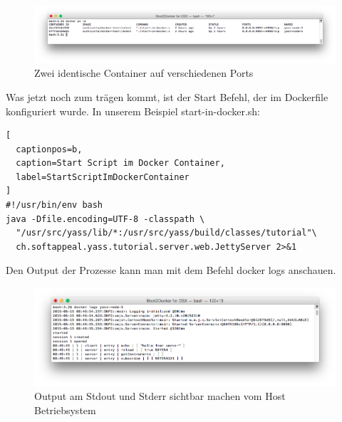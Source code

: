 \begin{figure}[htbp]
  \begin{center}
    \includegraphics[width=1.0\textwidth]{./images/twoProcesses.png}
    \caption{Zwei identische Container auf verschiedenen Ports}
    \label{img:twoProcesses}
  \end{center}
\end{figure}

Was jetzt noch zum trägen kommt, ist der Start Befehl, der im Dockerfile
konfiguriert wurde. In unserem Beispiel start-in-docker.sh:
\\

\begin{lstlisting}[
  captionpos=b,
  caption=Start Script im Docker Container,
  label=StartScriptImDockerContainer
]
#!/usr/bin/env bash
java -Dfile.encoding=UTF-8 -classpath \
  "/usr/src/yass/lib/*:/usr/src/yass/build/classes/tutorial"\
  ch.softappeal.yass.tutorial.server.web.JettyServer 2>&1
\end{lstlisting}

Den Output der Prozesse kann man mit dem Befehl docker logs anschauen.

\begin{figure}[htbp]
  \begin{center}
    \includegraphics[width=1.0\textwidth]{./images/logOutput.png}
    \caption{Output am Stdout und Stderr sichtbar machen vom Host Betriebsystem}
    \label{img:logOutput}
  \end{center}
\end{figure}





